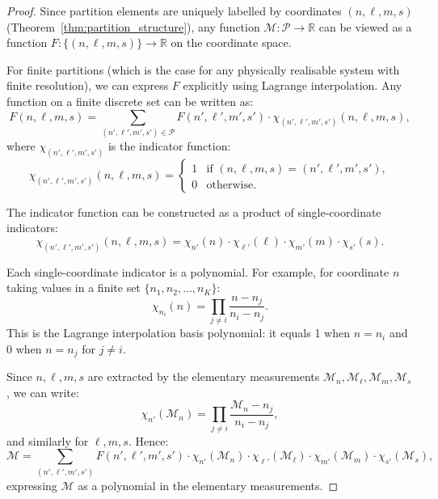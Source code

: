 \documentclass[twocolumn,10pt,a4paper]{article}
\theoremstyle{remark}
\newcommand{\partition}{\mathcal{P}}
\newcommand{\Reals}{\mathbb{R}}
\begin{document}
\begin{proof}
Since partition elements are uniquely labelled by coordinates $(n, \ell, m, s)$ (Theorem~\ref{thm:partition_structure}), any function $\mathcal{M}: \partition \to \Reals$ can be viewed as a function $F: \{(n, \ell, m, s)\} \to \Reals$ on the coordinate space.

For finite partitions (which is the case for any physically realisable system with finite resolution), we can express $F$ explicitly using Lagrange interpolation. Any function on a finite discrete set can be written as:
\begin{equation}
F(n, \ell, m, s) = \sum_{(n', \ell', m', s') \in \partition} F(n', \ell', m', s') \cdot \chi_{(n', \ell', m', s')}(n, \ell, m, s),
\end{equation}
where $\chi_{(n', \ell', m', s')}$ is the indicator function:
\begin{equation}
\chi_{(n', \ell', m', s')}(n, \ell, m, s) = \begin{cases}
1 & \text{if } (n, \ell, m, s) = (n', \ell', m', s'), \\
0 & \text{otherwise}.
\end{cases}
\end{equation}

The indicator function can be constructed as a product of single-coordinate indicators:
\begin{equation}
\chi_{(n', \ell', m', s')}(n, \ell, m, s) = \chi_{n'}(n) \cdot \chi_{\ell'}(\ell) \cdot \chi_{m'}(m) \cdot \chi_{s'}(s).
\end{equation}

Each single-coordinate indicator is a polynomial. For example, for coordinate $n$ taking values in a finite set $\{n_1, n_2, \ldots, n_K\}$:
\begin{equation}
\chi_{n_i}(n) = \prod_{j \neq i} \frac{n - n_j}{n_i - n_j}.
\end{equation}
This is the Lagrange interpolation basis polynomial: it equals 1 when $n = n_i$ and 0 when $n = n_j$ for $j \neq i$.

Since $n, \ell, m, s$ are extracted by the elementary measurements $\mathcal{M}_n, \mathcal{M}_\ell, \mathcal{M}_m, \mathcal{M}_s$, we can write:
\begin{equation}
\chi_{n'}(\mathcal{M}_n) = \prod_{j \neq i} \frac{\mathcal{M}_n - n_j}{n_i - n_j},
\end{equation}
and similarly for $\ell, m, s$. Hence:
\begin{equation}
\mathcal{M} = \sum_{(n', \ell', m', s')} F(n', \ell', m', s') \cdot \chi_{n'}(\mathcal{M}_n) \cdot \chi_{\ell'}(\mathcal{M}_\ell) \cdot \chi_{m'}(\mathcal{M}_m) \cdot \chi_{s'}(\mathcal{M}_s),
\end{equation}
expressing $\mathcal{M}$ as a polynomial in the elementary measurements.
\end{proof}
\end{document}
